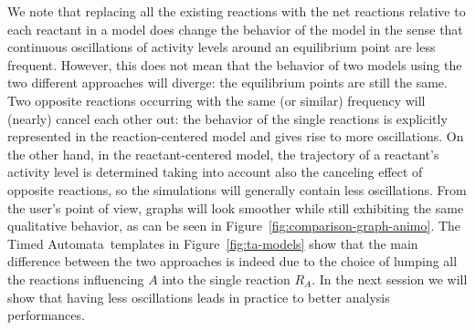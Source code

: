 \documentclass{llncs}
\newcommand{\tas}{Timed Automata}
\begin{document}
We note that replacing all the existing reactions with the net reactions relative to each
reactant in a model does change the behavior of the model in the sense that continuous oscillations
of activity levels around an equilibrium point are less frequent. However, this does not mean that the
behavior of two models using the two different approaches will diverge: the equilibrium points
are still the same.
Two opposite reactions occurring with the same (or similar) frequency will (nearly) cancel each other out: the
behavior of the single reactions is explicitly represented in the reaction-centered model and gives rise to more oscillations.
On the other hand, in the reactant-centered model, the trajectory of a reactant's activity level
is determined taking into account also the canceling effect of opposite reactions, so the simulations
will generally contain less oscillations.
From the user's point of view, graphs will look smoother while still exhibiting the same qualitative behavior,
as can be seen in Figure~\ref{fig:comparison-graph-animo}.
The \tas\ templates in Figure~\ref{fig:ta-models} show that the main difference between the two approaches
is indeed due to the choice of lumping all the reactions influencing $A$ into the single
reaction $R_A$.
In the next session we will show that having less oscillations leads in practice to better analysis performances.
\end{document}

